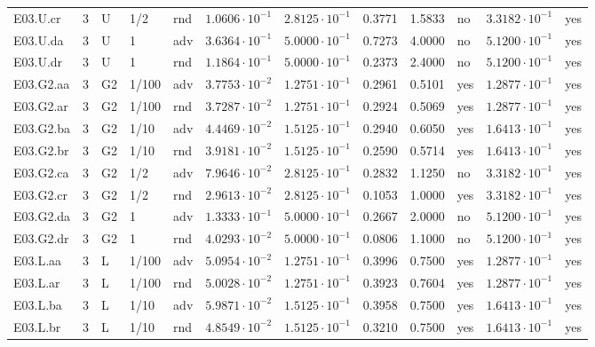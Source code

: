 {\begin{longtable}{@{}lllllllllll l@{}}
E03.U.cr & 3 & U & 1/2 & rnd & $1.0606\cdot 10^{-1}$ & $2.8125\cdot 10^{-1}$ & 0.3771 & 1.5833 & no & $3.3182\cdot 10^{-1}$ & yes \\
E03.U.da & 3 & U & 1 & adv & $3.6364\cdot 10^{-1}$ & $5.0000\cdot 10^{-1}$ & 0.7273 & 4.0000 & no & $5.1200\cdot 10^{-1}$ & yes \\
E03.U.dr & 3 & U & 1 & rnd & $1.1864\cdot 10^{-1}$ & $5.0000\cdot 10^{-1}$ & 0.2373 & 2.4000 & no & $5.1200\cdot 10^{-1}$ & yes \\
E03.G2.aa & 3 & G2 & 1/100 & adv & $3.7753\cdot 10^{-2}$ & $1.2751\cdot 10^{-1}$ & 0.2961 & 0.5101 & yes & $1.2877\cdot 10^{-1}$ & yes \\
E03.G2.ar & 3 & G2 & 1/100 & rnd & $3.7287\cdot 10^{-2}$ & $1.2751\cdot 10^{-1}$ & 0.2924 & 0.5069 & yes & $1.2877\cdot 10^{-1}$ & yes \\
E03.G2.ba & 3 & G2 & 1/10 & adv & $4.4469\cdot 10^{-2}$ & $1.5125\cdot 10^{-1}$ & 0.2940 & 0.6050 & yes & $1.6413\cdot 10^{-1}$ & yes \\
E03.G2.br & 3 & G2 & 1/10 & rnd & $3.9181\cdot 10^{-2}$ & $1.5125\cdot 10^{-1}$ & 0.2590 & 0.5714 & yes & $1.6413\cdot 10^{-1}$ & yes \\
E03.G2.ca & 3 & G2 & 1/2 & adv & $7.9646\cdot 10^{-2}$ & $2.8125\cdot 10^{-1}$ & 0.2832 & 1.1250 & no & $3.3182\cdot 10^{-1}$ & yes \\
E03.G2.cr & 3 & G2 & 1/2 & rnd & $2.9613\cdot 10^{-2}$ & $2.8125\cdot 10^{-1}$ & 0.1053 & 1.0000 & yes & $3.3182\cdot 10^{-1}$ & yes \\
E03.G2.da & 3 & G2 & 1 & adv & $1.3333\cdot 10^{-1}$ & $5.0000\cdot 10^{-1}$ & 0.2667 & 2.0000 & no & $5.1200\cdot 10^{-1}$ & yes \\
E03.G2.dr & 3 & G2 & 1 & rnd & $4.0293\cdot 10^{-2}$ & $5.0000\cdot 10^{-1}$ & 0.0806 & 1.1000 & no & $5.1200\cdot 10^{-1}$ & yes \\
E03.L.aa & 3 & L & 1/100 & adv & $5.0954\cdot 10^{-2}$ & $1.2751\cdot 10^{-1}$ & 0.3996 & 0.7500 & yes & $1.2877\cdot 10^{-1}$ & yes \\
E03.L.ar & 3 & L & 1/100 & rnd & $5.0028\cdot 10^{-2}$ & $1.2751\cdot 10^{-1}$ & 0.3923 & 0.7604 & yes & $1.2877\cdot 10^{-1}$ & yes \\
E03.L.ba & 3 & L & 1/10 & adv & $5.9871\cdot 10^{-2}$ & $1.5125\cdot 10^{-1}$ & 0.3958 & 0.7500 & yes & $1.6413\cdot 10^{-1}$ & yes \\
E03.L.br & 3 & L & 1/10 & rnd & $4.8549\cdot 10^{-2}$ & $1.5125\cdot 10^{-1}$ & 0.3210 & 0.7500 & yes & $1.6413\cdot 10^{-1}$ & yes \\

\end{longtable}}
